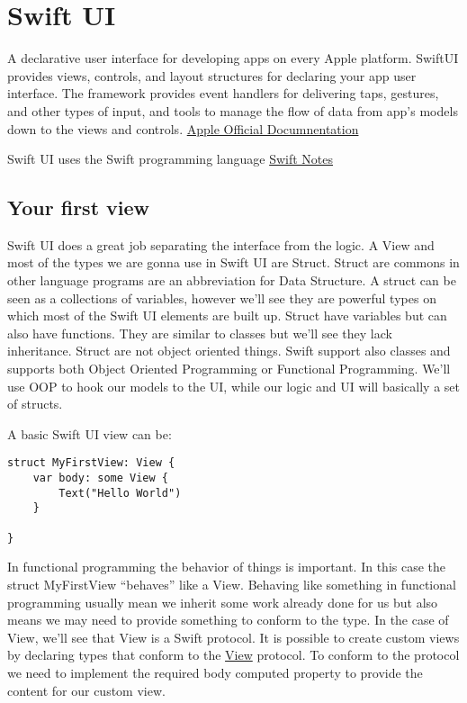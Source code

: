 \documentclass[]{article}
\date{}
\begin{document}
\hypertarget{swift-ui}{%
\section{Swift UI}\label{swift-ui}}

A declarative user interface for developing apps on every Apple
platform. SwiftUI provides views, controls, and layout structures for
declaring your app user interface. The framework provides event handlers
for delivering taps, gestures, and other types of input, and tools to
manage the flow of data from app's models down to the views and
controls.
\href{https://developer.apple.com/documentation/swiftui/}{Apple Official
Documnentation}

Swift UI uses the Swift programming language
\href{https://github.com/nick88msn/swift-starter-kit}{Swift Notes}

\hypertarget{your-first-view}{%
\subsection{Your first view}\label{your-first-view}}

Swift UI does a great job separating the interface from the logic. A
View and most of the types we are gonna use in Swift UI are Struct.
Struct are commons in other language programs are an abbreviation for
Data Structure. A struct can be seen as a collections of variables,
however we'll see they are powerful types on which most of the Swift UI
elements are built up. Struct have variables but can also have
functions. They are similar to classes but we'll see they lack
inheritance. Struct are not object oriented things. Swift support also
classes and supports both Object Oriented Programming or Functional
Programming. We'll use OOP to hook our models to the UI, while our logic
and UI will basically a set of structs.

A basic Swift UI view can be:

\begin{verbatim}
struct MyFirstView: View {
    var body: some View {
        Text("Hello World")
    }

}
\end{verbatim}

In functional programming the behavior of things is important. In this
case the struct MyFirstView ``behaves'' like a View. Behaving like
something in functional programming usually mean we inherit some work
already done for us but also means we may need to provide something to
conform to the type. In the case of View, we'll see that View is a Swift
protocol. It is possible to create custom views by declaring types that
conform to the
\href{https://developer.apple.com/documentation/swiftui/view}{View}
protocol. To conform to the protocol we need to implement the required
body computed property to provide the content for our custom view.
\end{document}
